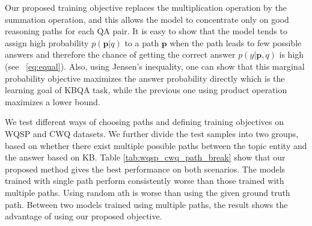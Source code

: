 Our proposed training objective replaces the multiplication operation by the summation operation, and this allows the model to concentrate only on good reasoning paths for each QA pair. It is easy to show that the model tends to assign high probability $p(\mathbf{p}|q)$ to a path $\mathbf{p}$ when the path leads to few possible answers and therefore the chance of getting the correct answer $p(y|\mathbf{p},q)$ is high (see ~\ref{eq:equal}). Also, using Jensen's inequality, one can show that this marginal probability objective maximizes the answer probability directly which is the learning goal of KBQA task, while the previous one using product operation maximizes a lower bound. %


We test different ways of choosing paths and defining training objectives on WQSP and CWQ datasets. We further divide the test samples into two groups, based on whether there exist multiple possible paths between the topic entity and the answer based on KB. Table \ref{tab:wqsp_cwq_path_break} show that our proposed method gives the best performance on both scenarios. The models trained with single path perform consistently worse than those trained with multiple paths. Using random ath is worse than using the given ground truth path. Between two models trained using multiple paths, the result shows the advantage of using our proposed objective.




